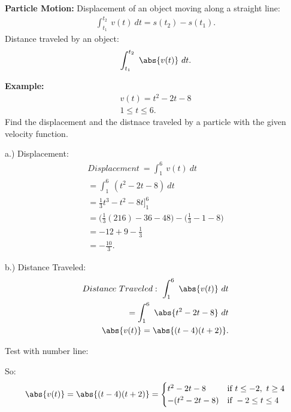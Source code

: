 \documentclass{report}
\begin{document}
\pagebreak \bigbreak \noindent
\begin{mdframed}
  \textbf{Particle Motion:}
  \bigbreak \noindent 
  Displacement of an object moving along a straight line:
  \begin{align*}
    \int_{t_{1}}^{t_{2}}\ v(t)\ dt = s(t_{2}) - s(t_{1}) 
  .\end{align*}
  \bigbreak \noindent 
  Distance traveled by an object:
  \begin{align*}
    \int_{t_{1}}^{t_{2}}\ \abs{v(t)}\ dt
  .\end{align*}
\end{mdframed}

\bigbreak \noindent 
\begin{mdframed}
  \textbf{Example:}
  \begin{align*}
    v(t) = t^{2} - 2t -8 \\
    1 \leq t \leq 6
  .\end{align*}
  \bigbreak \noindent 
  Find the displacement and the distnace traveled by a particle with the given velocity function.
\end{mdframed}

  \bigbreak \noindent \bigbreak \noindent
  a.) Displacement:
  \begin{align*}
    Displacement\ = \int_{1}^{6}\ v(t)\ dt \\
    = \int_{1}^{6}\ (t^{2}-2t-8)\ dt \\
    = \frac{1}{3}t^{3} - t^{2} - 8t\bigg]_{1}^{6} \\
    = \bigg(\frac{1}{3}(216) - 36 - 48\bigg) - \bigg(\frac{1}{3}-1-8\bigg) \\
    = -12 + 9 -\frac{1}{3} \\
    \boxed{=-\frac{10}{3}}
  .\end{align*}

  \bigbreak \noindent \bigbreak \noindent
  b.) Distance Traveled:
  \begin{align*}
    Distance\ Traveled:\ \int_{1}^{6}\ \abs{v(t)}\ dt \\
    = \int_{1}^{6}\ \abs{t^{2}-2t - 8}\ dt \\
    \abs{v(t)} = \abs{(t-4)(t+2)}
  .\end{align*}

  \pagebreak \bigbreak \noindent
  Test with number line:
  \begin{figure}[h]
      \centering
      \label{fig:nline}
  \end{figure}

  \bigbreak \noindent
  So:
     \begin{equation}
       \abs{v(t)} = \abs{(t-4)(t+2)}    
        =\begin{cases}
           t^{2}-2t -8   & \text{if } t \leq -2,\ t \geq 4 \\
          -(t^{2}-2t - 8) & \text{if }  -2 \leq t \leq 4
          \end{cases}
      \end{equation}
\end{document}
